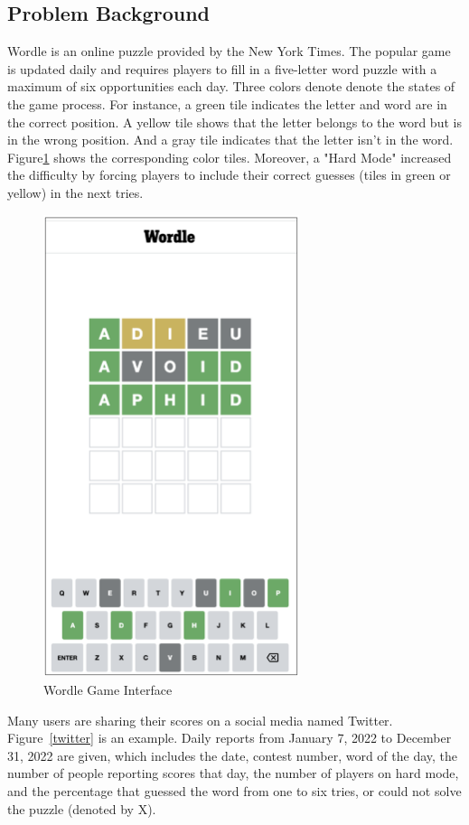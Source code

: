 \documentclass[12pt]{article}
\begin{document}
\subsection{Problem Background}
Wordle is an online puzzle provided by the New York Times. The popular game is updated daily and requires players to fill in a five-letter word puzzle with a maximum of six opportunities each day. Three colors denote denote the states of the game process. For instance, a green tile indicates the letter and word are in the correct position. A yellow tile shows that the letter belongs to the word but is in the wrong position. And a gray tile indicates that the letter isn't in the word. Figure\ref{wordle} shows the corresponding color tiles. Moreover, a "Hard Mode" increased the difficulty by forcing players to include their correct guesses (tiles in green or yellow) in the next tries.

\begin{figure}[h]
    \centering
    \includegraphics[width=7.5cm]{figures/wordle.png}
    \caption{Wordle Game Interface}
    \label{wordle}
\end{figure}

\vspace{0.3cm}
\noindent
Many users are sharing their scores on a social media named Twitter. Figure~\ref{twitter} is an example. Daily reports from January 7, 2022 to December 31, 2022 are given, which includes the date, contest number, word of the day, the number of people reporting scores that day, the number of players on hard mode, and the percentage that guessed the word from one to six tries, or could not solve the puzzle (denoted by X). 
\end{document}
